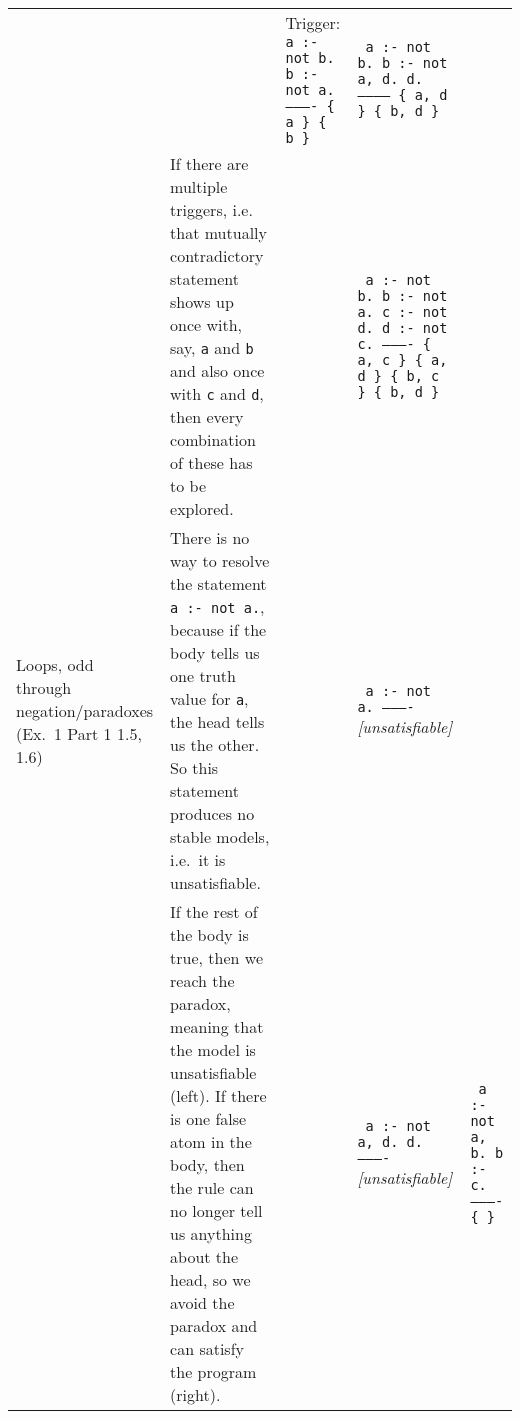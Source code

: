 \documentclass[9pt,a4paper,landscape]{article}
\begin{document}
{\begin{longtable}{Lp{14.5cm}lXX}
&& Trigger: \newline
\texttt{%
	a :- not b. \newline
	b :- not a. \newline
	---------- \newline
	\{ a \} \newline
	\{ b \}}
& \texttt{%
	a :- not b. \newline
	b :- not a, d. \newline
	d. \newline
	----------- \newline
	\{ a, d \} \newline
	\{ b, d \}} \newline \\ %


& If there are multiple triggers, i.e. that mutually contradictory statement shows up once with, say, \texttt{a} and \texttt{b} and also once with \texttt{c} and \texttt{d}, then every combination of these has to be explored.
&& \texttt{%
	a :- not b. \newline
	b :- not a. \newline
	c :- not d. \newline
	d :- not c. \newline
	---------- \newline
	\{ a, c \} \newline
	\{ a, d \} \newline
	\{ b, c \} \newline
	\{ b, d \}}
&\\ \midrule

Loops, odd \newline through negation\slash \newline paradoxes \newline (Ex.\ 1 Part 1  1.5, 1.6)
& There is no way to resolve the statement \texttt{a :- not a.}, because if the body tells us one truth value for \texttt{a}, the head tells us the other.
So this statement produces no stable models, i.e.\ it is unsatisfiable.		
&& \texttt{%
	a :- not a. \newline
	---------- \newline}
\textit{[unsatisfiable]}
& \\ %

& If the rest of the body is true, then we reach the paradox, meaning that the model is unsatisfiable (left).
If there is one false atom in the body, then the rule can no longer tell us anything about the head, so we avoid the paradox and can satisfy the program (right).
&& \texttt{%
	a :- not a, d. \newline
	d. \newline
	---------- \newline}
\textit{[unsatisfiable]}
& \texttt{%
	a :- not a, b. \newline
	b :- c. \newline
	---------- \newline
	\{ \} } \\ \midrule



\end{longtable}}
\end{document}
